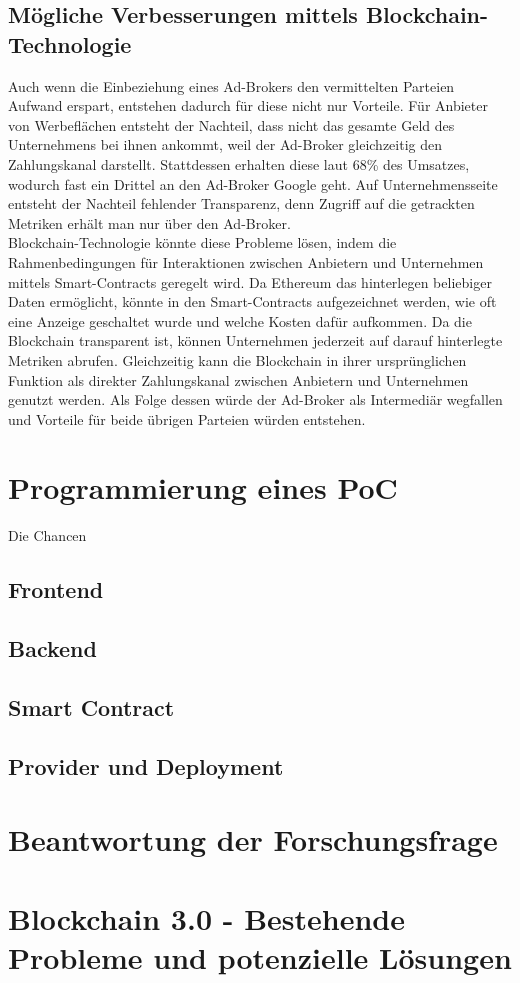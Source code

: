 \subsection{Mögliche Verbesserungen mittels Blockchain-Technologie}
Auch wenn die Einbeziehung eines Ad-Brokers den vermittelten Parteien Aufwand erspart, entstehen dadurch für diese nicht nur Vorteile. Für Anbieter von Werbeflächen entsteht der Nachteil, dass nicht das gesamte Geld des Unternehmens bei ihnen ankommt, weil der Ad-Broker gleichzeitig den Zahlungskanal darstellt. Stattdessen erhalten diese laut \cite{google_adsense_2021} 68\% des Umsatzes, wodurch fast ein Drittel an den Ad-Broker Google geht. Auf Unternehmensseite entsteht der Nachteil fehlender Transparenz, denn Zugriff auf die getrackten Metriken erhält man nur über den Ad-Broker.\\
Blockchain-Technologie könnte diese Probleme lösen, indem die Rahmenbedingungen für Interaktionen zwischen Anbietern und Unternehmen mittels Smart-Contracts geregelt wird. Da Ethereum das hinterlegen beliebiger Daten ermöglicht, könnte in den Smart-Contracts aufgezeichnet werden, wie oft eine Anzeige geschaltet wurde und welche Kosten dafür aufkommen. Da die Blockchain transparent ist, können Unternehmen jederzeit auf darauf hinterlegte Metriken abrufen. Gleichzeitig kann die Blockchain in ihrer ursprünglichen Funktion als direkter Zahlungskanal zwischen Anbietern und Unternehmen genutzt werden. Als Folge dessen würde der Ad-Broker als Intermediär wegfallen und Vorteile für beide übrigen Parteien würden entstehen.
\section{Programmierung eines PoC}
Die Chancen
\subsection{Frontend}
\subsection{Backend}
\subsection{Smart Contract}
\subsection{Provider und Deployment}
\section{Beantwortung der Forschungsfrage}
\section{Blockchain 3.0 - Bestehende Probleme und potenzielle Lösungen}